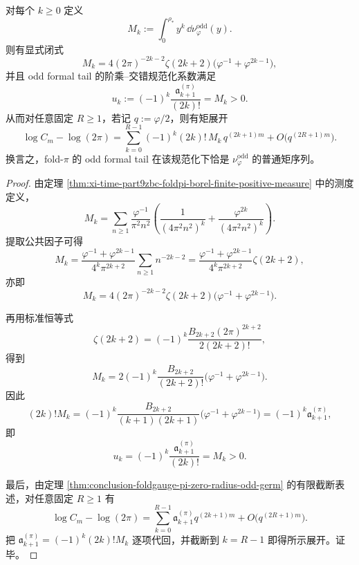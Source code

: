 \begin{theorem}[H.111 奇层系数的正矩公式]\label{thm:xi-time-part9zbc-foldpi-oddlayer-positive-moment-formula}
对每个 \(k\ge 0\) 定义
\[
M_k:=\int_{0}^{\rho_\ast}y^k\,\dd\nu_{\varphi}^{\mathrm{odd}}(y).
\]
则有显式闭式
\[
M_k
=
4(2\pi)^{-2k-2}\zeta(2k+2)\bigl(\varphi^{-1}+\varphi^{2k-1}\bigr),
\]
并且 odd formal tail 的阶乘--交错规范化系数满足
\[
u_k
:=
(-1)^k\frac{\mathfrak a_{k+1}^{(\pi)}}{(2k)!}
=
M_k
>0.
\]
从而对任意固定 \(R\ge 1\)，若记 \(q:=\varphi/2\)，则有矩展开
\[
\log C_m-\log(2\pi)
=
\sum_{k=0}^{R-1}
(-1)^k(2k)!\,M_k\,q^{(2k+1)m}
+O\!\bigl(q^{(2R+1)m}\bigr).
\]
换言之，fold-\(\pi\) 的 odd formal tail 在该规范化下恰是 \(\nu_{\varphi}^{\mathrm{odd}}\) 的普通矩序列。
\end{theorem}
\begin{proof}
由定理 \ref{thm:xi-time-part9zbc-foldpi-borel-finite-positive-measure} 中的测度定义，
\[
M_k
=
\sum_{n\ge 1}\frac{\varphi^{-1}}{\pi^2n^2}
\left(
\frac{1}{(4\pi^2n^2)^k}
+\frac{\varphi^{2k}}{(4\pi^2n^2)^k}
\right).
\]
提取公共因子可得
\[
M_k
=
\frac{\varphi^{-1}+\varphi^{2k-1}}{4^k\pi^{2k+2}}
\sum_{n\ge 1}n^{-2k-2}
=
\frac{\varphi^{-1}+\varphi^{2k-1}}{4^k\pi^{2k+2}}
\zeta(2k+2),
\]
亦即
\[
M_k
=
4(2\pi)^{-2k-2}\zeta(2k+2)\bigl(\varphi^{-1}+\varphi^{2k-1}\bigr).
\]

再用标准恒等式
\[
\zeta(2k+2)
=
(-1)^k\frac{B_{2k+2}(2\pi)^{2k+2}}{2(2k+2)!},
\]
得到
\[
M_k
=
2(-1)^k\frac{B_{2k+2}}{(2k+2)!}
\bigl(\varphi^{-1}+\varphi^{2k-1}\bigr).
\]
因此
\[
(2k)!M_k
=
(-1)^k
\frac{B_{2k+2}}{(k+1)(2k+1)}
\bigl(\varphi^{-1}+\varphi^{2k-1}\bigr)
=
(-1)^k\mathfrak a_{k+1}^{(\pi)},
\]
即
\[
u_k=(-1)^k\frac{\mathfrak a_{k+1}^{(\pi)}}{(2k)!}=M_k>0.
\]

最后，由定理 \ref{thm:conclusion-foldgauge-pi-zero-radius-odd-germ} 的有限截断表述，对任意固定 \(R\ge 1\) 有
\[
\log C_m-\log(2\pi)
=
\sum_{k=0}^{R-1}\mathfrak a_{k+1}^{(\pi)}q^{(2k+1)m}
+O\!\bigl(q^{(2R+1)m}\bigr).
\]
把
\(
\mathfrak a_{k+1}^{(\pi)}=(-1)^k(2k)!M_k
\)
逐项代回，并截断到 \(k=R-1\) 即得所示展开。证毕。
\end{proof}

